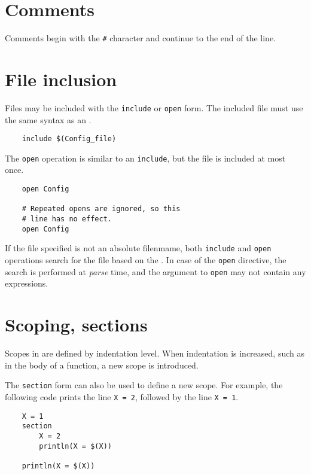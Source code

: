 \section{Comments}

Comments begin with the \verb+#+ character and continue to the end of the line.

\section{File inclusion}
\label{section:include}

Files may be included with the \verb+include+ or \verb+open+ form.  The included file must use
the same syntax as an .

\begin{verbatim}
    include $(Config_file)
\end{verbatim}

The \verb+open+ operation is similar to an \verb+include+, but the file is included at most once.
\begin{verbatim}
    open Config

    # Repeated opens are ignored, so this
    # line has no effect.
    open Config
\end{verbatim}

If the file specified is not an absolute filenmame, both \verb+include+ and
\verb+open+ operations search for the file based on the
. In case of the \verb+open+ directive, the search is
performed at \emph{parse} time, and the argument to \verb+open+ may not
contain any expressions.

\section{Scoping, sections}
\label{section:section}

Scopes in  are defined by indentation level.  When indentation is
increased, such as in the body of a function, a new scope is introduced.

The \verb+section+ form can also be used to define a new scope.  For example, the following code
prints the line \verb+X = 2+, followed by the line \verb+X = 1+.

\begin{verbatim}
    X = 1
    section
        X = 2
        println(X = $(X))

    println(X = $(X))
\end{verbatim}

